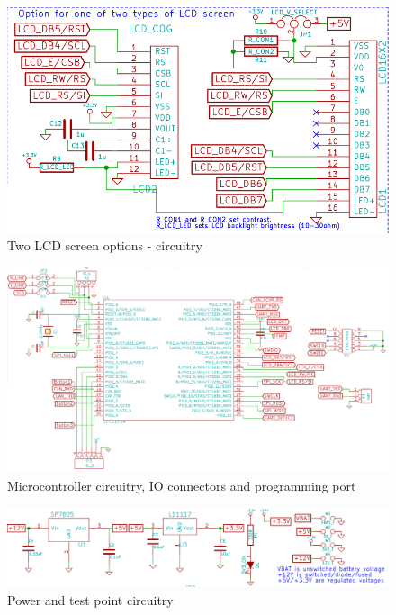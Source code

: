 \documentclass{article}
\begin{document}
\begin{figure}[H]
\centering
\includegraphics[width=140mm,angle=0]{../images/lcd_screens.png}
\caption{Two LCD screen options - circuitry}
\label{}
\end{figure}

\begin{figure}[H]
\centering
\includegraphics[width=140mm,angle=0]{../images/micro.png}
\caption{Microcontroller circuitry, IO connectors and programming port}
\label{}
\end{figure}

\begin{figure}[H]
\centering
\includegraphics[width=140mm,angle=0]{../images/pwr_and_test.png}
\caption{Power and test point circuitry}
\label{}
\end{figure}
\end{document}
